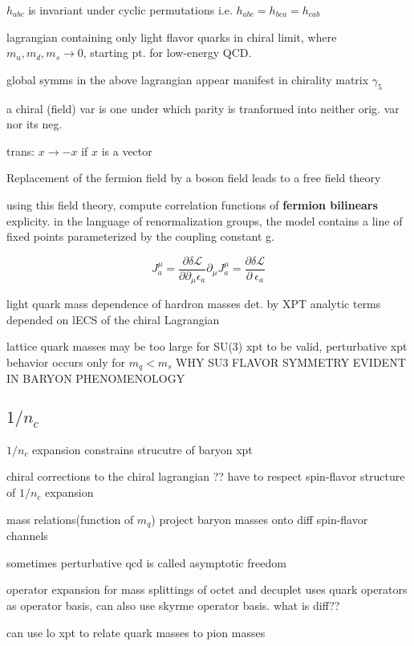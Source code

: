 \documentclass[12pt,tightenlines, raggedbottom, prd, notitlepage]{revtex4-1}
\begin{document}
$h_{abc}$ is invariant under cyclic permutations i.e. $h_{abc} = h_{bca} = h_{cab}$



lagrangian containing only light flavor quarks in chiral limit, where $m_u, m_d, m_s \rightarrow 0$, starting pt. for low-energy QCD. 

global symms in the above lagrangian appear manifest in chirality matrix $\gamma_5$

a chiral (field) var is one under which parity is tranformed into neither orig. var nor its neg. 

trans: $x \rightarrow -x$ if $x$ is a vector


Replacement of the fermion field by a boson field leads to a free field theory 

using this field theory, compute correlation functions of \textbf{fermion bilinears} explicity.
in the language of renormalization groups, the model contains a line of fixed points parameterized by 
the coupling constant g. 

$$
  J^\mu_a = \frac{\partial \delta \mathcal{L}}{\partial \partial_\mu \epsilon_a}
  \partial_{\mu} J^{\mu}_a = \frac{\partial \delta \mathcal{L}}{\partial\ \epsilon_a}
$$

light quark mass dependence of hardron masses det. by XPT 
analytic terms depended on lECS of the chiral Lagrangian

lattice quark masses may be too large for SU(3) xpt to be valid, 
perturbative xpt behavior occurs only for $m_q < m_s$
WHY SU3 FLAVOR SYMMETRY EVIDENT IN BARYON PHENOMENOLOGY

\subsection*{\texorpdfstring{$1/n_c$}{expansion}}
$1/n_c$ expansion constrains strucutre of baryon xpt 

chiral corrections to the chiral lagrangian ?? have to respect spin-flavor structure of $1/n_c$ expansion 

mass relations(function of $m_q$)  project baryon masses onto diff spin-flavor channels 

sometimes perturbative qcd is called asymptotic freedom 

operator expansion for mass splittings of octet and decuplet uses quark operators as operator basis, 
can also use skyrme operator basis. what is diff??


can use lo xpt to relate quark masses to pion masses  
\end{document}
